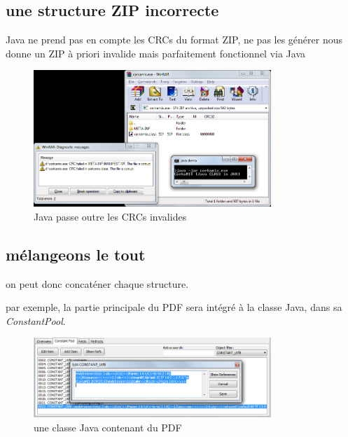 \subsection{une structure ZIP incorrecte}

Java ne prend pas en compte les CRCs du format ZIP, ne pas les générer nous donne un ZIP à priori invalide mais parfaitement fonctionnel via Java
\begin{figure}[ht]
  \centering
  \includegraphics[width=0.8\textwidth]{albertini/img/wrong_crcs}
  \caption{Java passe outre les CRCs invalides}
  \label{fig:albertini:wrong_crcs}
\end{figure}

\subsection{mélangeons le tout}
on peut donc concaténer chaque structure.

par exemple, la partie principale du PDF sera intégré à la classe Java, dans sa {\em ConstantPool}.

\begin{figure}[ht]
  \centering
  \includegraphics[width=0.8\textwidth]{albertini/img/pdfpool}
  \caption{une classe Java contenant du PDF}
  \label{fig:albertini:pdfpool}
\end{figure}


